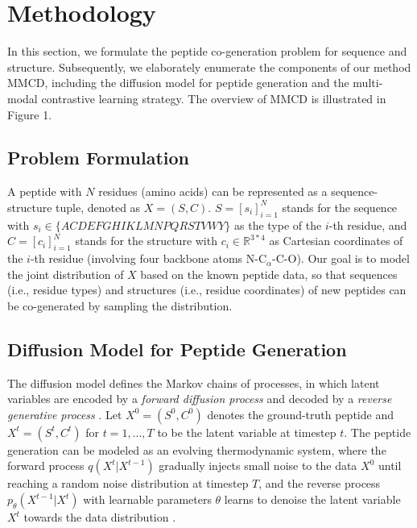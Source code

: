 \documentclass[letterpaper]{article}
\begin{document}
\section{Methodology}
In this section, we formulate the peptide co-generation problem for sequence and structure. Subsequently, we elaborately enumerate the components of our method MMCD, including the diffusion model for peptide generation and the multi-modal contrastive learning strategy. The overview of MMCD is illustrated in Figure 1.

\subsection{Problem Formulation}
A peptide with $N$ residues (amino acids) can be represented as a sequence-structure tuple, denoted as $X=(S,C)$. $S=[s_i]_{i=1}^{N}$ stands for the sequence with $s_i\in \{ACDEFGHIKLMNPQRSTVWY\}$ as the type of the $i$-th residue, and $C=[c_i]_{i=1}^{N}$ stands for the structure with $c_i \in \mathbb{R}^{3\ast4}$ as Cartesian coordinates of the $i$-th residue (involving four backbone atoms N-C$_\alpha$-C-O). Our goal is to model the joint distribution of $X$ based on the known peptide data, so that sequences (i.e., residue types) and structures (i.e., residue coordinates) of new peptides can be co-generated by sampling the distribution.

\subsection{Diffusion Model for Peptide Generation}
The diffusion model defines the Markov chains of processes, in which latent variables are encoded by a \emph{forward diffusion process} and decoded by a \emph{reverse generative process} \cite{sohl-dicksteinDeepUnsupervised2015}. Let $X^0=(S^0,C^0)$ denotes the ground-truth peptide and $X^t=(S^t,C^t)$ for $t=1,...,T$ to be the latent variable at timestep $t$. The peptide generation can be modeled as an evolving thermodynamic system, where the forward process $q(X^t|X^{t-1})$ gradually injects small noise to the data $X^0$ until reaching a random noise distribution at timestep $T$, and the reverse process $p_\theta(X^{t-1}|X^t)$ with learnable parameters $\theta$ learns to denoise the latent variable $X^t$ towards the data distribution \cite{luoAntigenSpecificAntibody2022}.
\end{document}
